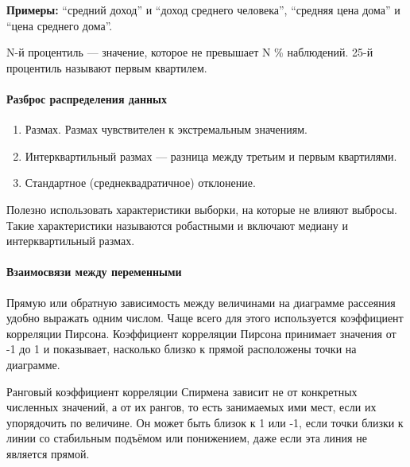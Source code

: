 \documentclass[11pt,a4paper]{article}
\providecommand{\tightlist}{%
      \setlength{\itemsep}{0pt}\setlength{\parskip}{0pt}}
\begin{document}
\textbf{Примеры:} ``средний доход'' и ``доход среднего человека'',
``средняя цена дома'' и ``цена среднего дома''.

N-й процентиль --- значение, которое не превышает N \% наблюдений. 25-й
процентиль называют первым квартилем.

    \hypertarget{ux440ux430ux437ux431ux440ux43eux441-ux440ux430ux441ux43fux440ux435ux434ux435ux43bux435ux43dux438ux44f-ux434ux430ux43dux43dux44bux445}{%
\paragraph{Разброс распределения
данных}\label{ux440ux430ux437ux431ux440ux43eux441-ux440ux430ux441ux43fux440ux435ux434ux435ux43bux435ux43dux438ux44f-ux434ux430ux43dux43dux44bux445}}

\begin{enumerate}
\def\labelenumi{\arabic{enumi}.}
\tightlist
\item
  Размах. Размах чувствителен к экстремальным значениям.
\item
  Интерквартильный размах --- разница между третьим и первым квартилями.
\item
  Стандартное (среднеквадратичное) отклонение.
\end{enumerate}

Полезно использовать характеристики выборки, на которые не влияют
выбросы. Такие характеристики называются робастными и включают медиану и
интерквартильный размах.

    \hypertarget{ux432ux437ux430ux438ux43cux43eux441ux432ux44fux437ux438-ux43cux435ux436ux434ux443-ux43fux435ux440ux435ux43cux435ux43dux43dux44bux43cux438}{%
\paragraph{Взаимосвязи между
переменными}\label{ux432ux437ux430ux438ux43cux43eux441ux432ux44fux437ux438-ux43cux435ux436ux434ux443-ux43fux435ux440ux435ux43cux435ux43dux43dux44bux43cux438}}

Прямую или обратную зависимость между величинами на диаграмме рассеяния
удобно выражать одним числом. Чаще всего для этого используется
коэффициент корреляции Пирсона. Коэффициент корреляции Пирсона принимает
значения от -1 до 1 и показывает, насколько близко к прямой расположены
точки на диаграмме.

Ранговый коэффициент корреляции Спирмена зависит не от конкретных
численных значений, а от их рангов, то есть занимаемых ими мест, если их
упорядочить по величине. Он может быть близок к 1 или -1, если точки
близки к линии со стабильным подъёмом или понижением, даже если эта
линия не является прямой.
\end{document}
